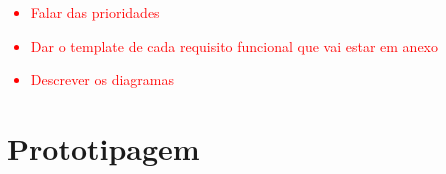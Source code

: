 \textcolor{red}{
	\begin{itemize}
		\item Falar das prioridades
		\item Dar o template de cada requisito funcional que vai estar em anexo
		\item Descrever os diagramas
	\end{itemize}	
}

\newpage





\newpage
\section{Prototipagem}
\label{prototipagem}


\blankpage

\glsresetall